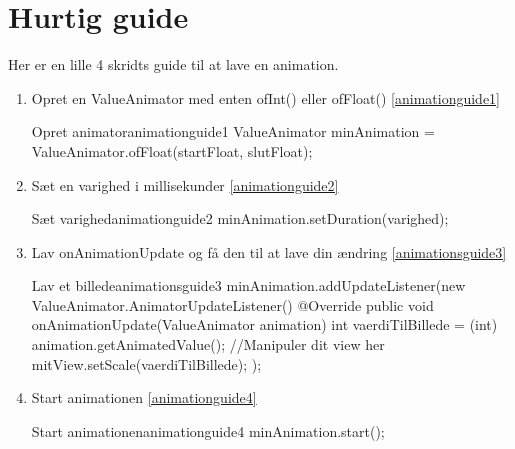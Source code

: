 \section{Hurtig guide}
Her er en lille 4 skridts guide til at lave en animation.
\begin{enumerate}
	\item Opret en ValueAnimator med enten ofInt() eller ofFloat() \autoref{animationguide1}
	\begin{JavaCode}{Opret animator}{animationguide1}
	ValueAnimator minAnimation = ValueAnimator.ofFloat(startFloat, slutFloat);
	\end{JavaCode}
	\item Sæt en varighed i millisekunder \autoref{animationguide2}
	\begin{JavaCode}{Sæt varighed}{animationguide2}
	minAnimation.setDuration(varighed);
	\end{JavaCode}
	\item Lav onAnimationUpdate og få den til at lave din ændring \autoref{animationsguide3}
	\begin{JavaCode}{Lav et billede}{animationsguide3}
		minAnimation.addUpdateListener(new ValueAnimator.AnimatorUpdateListener() {
			@Override
			public void onAnimationUpdate(ValueAnimator animation) {
				int vaerdiTilBillede = (int) animation.getAnimatedValue();
				//Manipuler dit view her
				mitView.setScale(vaerdiTilBillede);
			}
		});
	\end{JavaCode}
	\item Start animationen \autoref{animationguide4}
	\begin{JavaCode}{Start animationen}{animationguide4}
		minAnimation.start();
	\end{JavaCode}
\end{enumerate}
